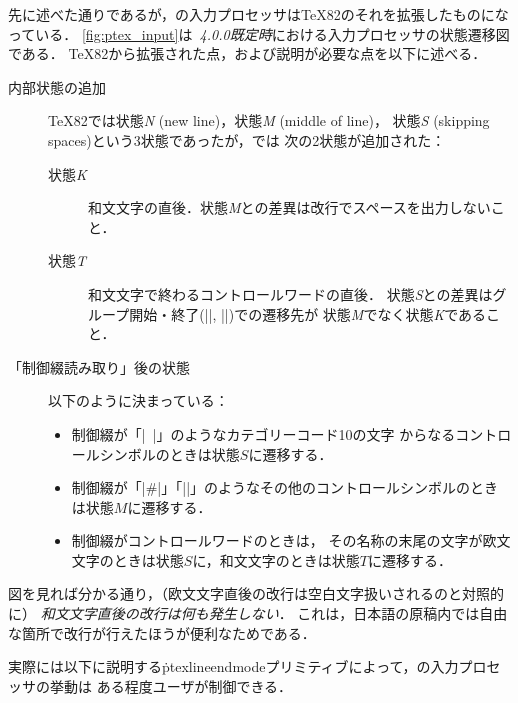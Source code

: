 \documentclass[a4paper,11pt,nomag,dvipdfmx]{jsarticle}
\begin{document}
先に述べた通りであるが，\pTeX の入力プロセッサは\TeX82のそれを拡張したものになっている．
\autoref{fig:ptex_input}は\emph{\pTeX~4.0.0既定時}における入力プロセッサの状態遷移図である．
\TeX82から拡張された点，および説明が必要な点を以下に述べる．
\begin{description}
  \item[内部状態の追加] \TeX82では状態\textit{N} (new line)，状態\textit{M} (middle of line)，
  状態\textit{S} (skipping spaces)という3状態であったが，\pTeX では
  次の2状態が追加された：
  \begin{description}
    \item[状態\textit{K}] 和文文字の直後．状態\textit{M}との差異は改行でスペースを出力しないこと．
    \item[状態\textit{T}] 和文文字で終わるコントロールワードの直後．
    状態\textit{S}との差異はグループ開始・終了(|{|, |}|)での遷移先が
    状態\textit{M}でなく状態\textit{K}であること．
  \end{description}
  \item[「制御綴読み取り」後の状態] 以下のように決まっている：
  \begin{itemize}
    \item 制御綴が「|\ |」のようなカテゴリーコード10の文字
    からなるコントロールシンボルのときは状態$S$に遷移する．
    \item 制御綴が「|\#|」「|\】|」のようなその他のコントロールシンボルのときは状態$M$に遷移する．
    \item 制御綴がコントロールワードのときは，
    その名称の末尾の文字が欧文文字のときは状態$S$に，和文文字のときは状態$T$に遷移する．
  \end{itemize}
\end{description}

図を見れば分かる通り，（欧文文字直後の改行は空白文字扱いされるのと対照的に）
\emph{和文文字直後の改行は何も発生しない}．
これは，日本語の原稿内では自由な箇所で改行が行えたほうが便利なためである．

実際には以下に説明する\.{ptexlineendmode}プリミティブによって，\pTeX の入力プロセッサの挙動は
ある程度ユーザが制御できる．
\end{document}
